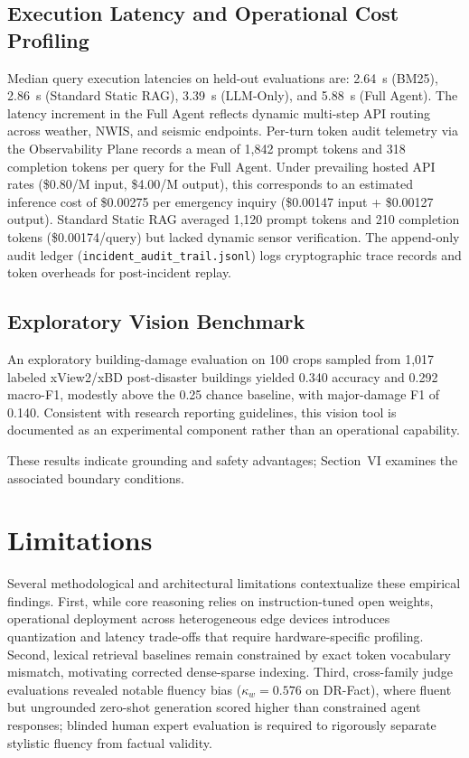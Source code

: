 \documentclass[conference]{IEEEtran}
\begin{document}
\subsection{Execution Latency and Operational Cost Profiling}
Median query execution latencies on held-out evaluations are: 2.64~s (BM25), 2.86~s (Standard Static RAG), 3.39~s (LLM-Only), and 5.88~s (Full Agent). The latency increment in the Full Agent reflects dynamic multi-step API routing across weather, NWIS, and seismic endpoints. Per-turn token audit telemetry via the Observability Plane records a mean of 1,842 prompt tokens and 318 completion tokens per query for the Full Agent. Under prevailing hosted API rates (\$0.80/M input, \$4.00/M output), this corresponds to an estimated inference cost of \$0.00275 per emergency inquiry (\$0.00147 input + \$0.00127 output). Standard Static RAG averaged 1,120 prompt tokens and 210 completion tokens (\$0.00174/query) but lacked dynamic sensor verification. The append-only audit ledger (\texttt{incident\_audit\_trail.jsonl}) logs cryptographic trace records and token overheads for post-incident replay.

\subsection{Exploratory Vision Benchmark}
An exploratory building-damage evaluation on 100 crops sampled from 1,017 labeled xView2/xBD post-disaster buildings \cite{xview2} yielded 0.340 accuracy and 0.292 macro-F1, modestly above the 0.25 chance baseline, with major-damage F1 of 0.140. Consistent with research reporting guidelines, this vision tool is documented as an experimental component rather than an operational capability.



These results indicate grounding and safety advantages; Section~VI examines the associated boundary conditions.

\section{Limitations}
\label{sec:threats}
Several methodological and architectural limitations contextualize these empirical findings. First, while core reasoning relies on instruction-tuned open weights, operational deployment across heterogeneous edge devices introduces quantization and latency trade-offs that require hardware-specific profiling. Second, lexical retrieval baselines remain constrained by exact token vocabulary mismatch, motivating corrected dense-sparse indexing. Third, cross-family judge evaluations revealed notable fluency bias ($\kappa_w = 0.576$ on DR-Fact), where fluent but ungrounded zero-shot generation scored higher than constrained agent responses; blinded human expert evaluation is required to rigorously separate stylistic fluency from factual validity.
\end{document}
